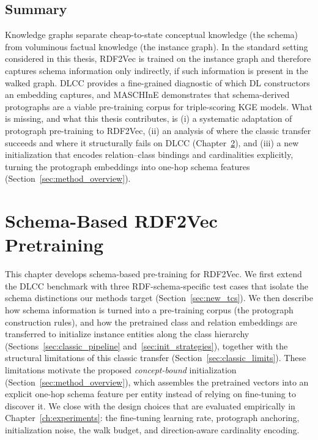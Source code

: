 \documentclass[a4paper,oneside,bibliography=totoc]{scrbook}
\begin{document}
\section{Summary}
\label{sec:lit_summary}

Knowledge graphs separate cheap-to-state conceptual knowledge (the schema)
from voluminous factual knowledge (the instance graph). In the standard setting considered in this thesis, RDF2Vec is trained on the instance graph and therefore captures schema information only indirectly, if such information is present in the walked graph. DLCC
provides a fine-grained diagnostic of which DL constructors an embedding
captures, and MASCHInE demonstrates that schema-derived protographs are a
viable pre-training corpus for triple-scoring KGE models. What is missing,
and what this thesis contributes, is (i) a systematic adaptation of
protograph pre-training to RDF2Vec, (ii) an analysis of where the classic
transfer succeeds and where it structurally fails on DLCC
(Chapter~\ref{ch:classic}), and (iii) a new initialization that encodes
relation--class bindings and cardinalities explicitly, turning the protograph
embeddings into one-hop schema features (Section~\ref{sec:method_overview}).

\chapter{Schema-Based RDF2Vec Pretraining}
\label{ch:classic}
\label{ch:schema_pretraining}

This chapter develops schema-based pre-training for RDF2Vec. We first extend
the DLCC benchmark with three RDF-schema-specific test cases that isolate the
schema distinctions our methods target (Section~\ref{sec:new_tcs}). We then
describe how schema information is turned into a pre-training corpus (the
protograph construction rules), and how the pretrained class and relation
embeddings are transferred to initialize instance entities along the class
hierarchy (Sections~\ref{sec:classic_pipeline} and~\ref{sec:init_strategies}),
together with the structural limitations of this classic transfer
(Section~\ref{sec:classic_limits}). These limitations motivate the proposed
\emph{concept-bound} initialization (Section~\ref{sec:method_overview}), which
assembles the pretrained vectors into an explicit one-hop schema feature per
entity instead of relying on fine-tuning to discover it. We close with the
design choices that are evaluated empirically in
Chapter~\ref{ch:experiments}: the fine-tuning learning rate, protograph
anchoring, initialization noise, the walk budget, and direction-aware
cardinality encoding.
\end{document}
